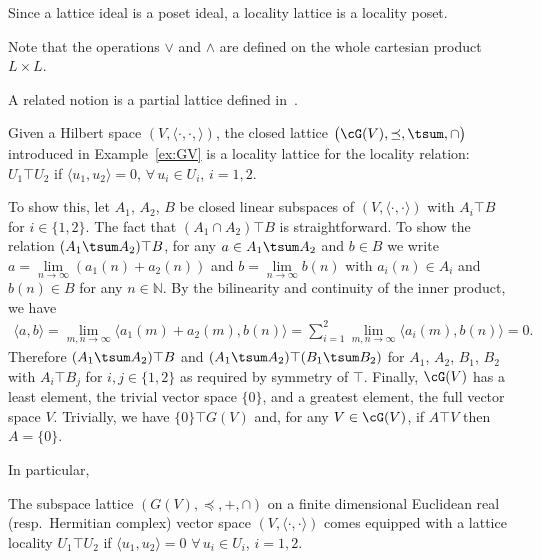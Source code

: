 \documentclass[10pt,a4paper]{amsart}
\numberwithin{equation}{section}
\newcommand{\N}{\mathbb{N}}
\newcommand{\loc}{locality\xspace}
\begin{document}
Since a lattice ideal is a poset ideal, a \loc lattice is a \loc poset.

Note that the operations $\vee$ and $\wedge$ are defined on the whole cartesian product $L\times L$. \begin{Remark}A related notion is a partial lattice defined in~\cite[Section~I5.4]{Gra1}.
	\end{Remark}

\begin{Example} \label{ex:GVlocality} Given a Hilbert space $(V, \langle \cdot, \cdot, \rangle)$, the closed \subsp lattice $\big(\cG(V),\preceq,\tsum,\cap\big)$ introduced in Example~\ref{ex:GV} is a \loc lattice for the \loc relation: $U_1\top U_2$ if $\langle u_1, u_2\rangle=0$, $\forall\, u_i\in U_i$, $i=1,2$.

To show this, let $A_1$, $A_2$, $B$ be closed linear subspaces of $(V, \langle\cdot, \cdot\rangle)$ with $A_i\top B$ for $i\in\{1,2\}$. The fact that $(A_1\cap A_2) \top B$ is
straightforward. To show the relation $(A_1\tsum A_2) \top B$, for any $a\in A_1\tsum A_2$ and $b\in B$ we write $a=\underset{n\to \infty}{\lim}(a_1(n)+a_2(n))$ and $b=\underset{n\to \infty}{\lim} b(n)$ with $a_i(n)\in A_i$ and $b(n)\in B$ for any $n\in \N$.
By the bilinearity and continuity of the inner product, we have
\begin{gather*}
\langle a,b\rangle = \underset{m,n\to \infty}{\lim}\langle a_1(m)+a_2(m),b(n)\rangle = \sum_{i=1}^2\underset{m,n\to \infty}{\lim}\langle a_i(m),b(n)\rangle=0.
\end{gather*}
Therefore $(A_1\tsum A_2) \top B$ and $(A_1\tsum A_2) \top (B_1\tsum B_2)$ for $A_1$, $A_2$, $B_1$, $B_2$ with $A_i\top B_j$ for $i,j\in\{1,2\}$ as required by symmetry of $\top$. Finally, $\cG(V)$ has a least element, the trivial vector space $\{0\}$, and a greatest
element, the full vector space $V$. Trivially, we have $\{0\}\top G(V)$ and, for any $V\in \cG(V)$, if $A\top V$ then $ A=\{0\}$.
\end{Example}
In particular,
\begin{Example} %
The subspace lattice $(G(V), \preceq, +, \cap)$ on a finite dimensional Euclidean real (resp.~Hermitian complex) vector space $(V, \langle \cdot, \cdot\rangle)$ comes equipped with a lattice locality $U_1\top U_2$ if $\langle u_1, u_2\rangle=0$ $\forall\, u_i\in U_i$, $i=1,2$.
	\end{Example}
\end{document}

